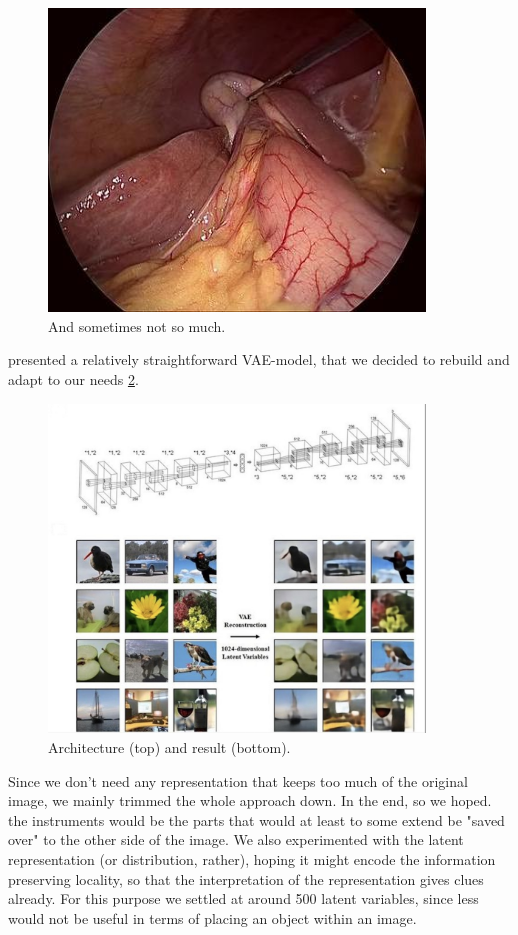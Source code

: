 \begin{figure}[H]
	\centering
	\includegraphics[width=10cm]{3_methodology/tools_bad}
	\caption{And sometimes not so much.}
	\label{fig:Tools_Bad}
\end{figure}

\cite{articleVAE} presented a relatively straightforward VAE-model, that we decided to rebuild and adapt to our needs \ref{fig:VAE}. 

\begin{figure}[H]
	\centering
	\includegraphics[width=10cm]{3_methodology/VAE_arch}
	\caption{Architecture (top) and result (bottom).}
	\label{fig:VAE}
\end{figure}


Since we don't need any representation that keeps too much of the original image, we mainly trimmed the whole approach down.
In the end, so we hoped. the instruments would be the parts that would at least to some extend be "saved over" to the other side of the image. We also experimented with the latent representation (or distribution, rather), hoping it might encode the information preserving locality, so that the interpretation of the representation gives clues already. For this purpose we settled at around 500 latent variables, since less would not be useful in terms of placing an object within an image. 

